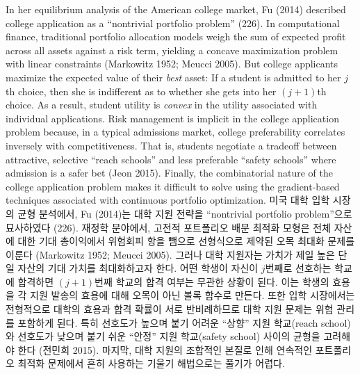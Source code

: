 \documentclass[11pt]{article} %
\theoremstyle{definition}
\theoremstyle{definition}
\begin{document}
\ifen
In her equilibrium analysis of the American college market, Fu (2014) described college application as a ``nontrivial portfolio problem'' (226). In computational finance, traditional portfolio allocation models weigh the sum of expected profit across all assets against a risk term, yielding a concave maximization problem with linear constraints (Markowitz 1952; Meucci 2005). But college applicants maximize the expected value of their \emph{best} asset: If a student is admitted to her $j$th choice, then she is indifferent as to whether she gets into her $(j+1)$th choice. As a result, student utility is \emph{convex} in the utility associated with individual applications. Risk management is implicit in the college application problem because, in a typical admissions market, college preferability correlates inversely with competitiveness. That is, students negotiate a tradeoff between attractive, selective “reach schools” and less preferable “safety schools” where admission is a safer bet (Jeon 2015). Finally, the combinatorial nature of the college application problem makes it difficult to solve using the gradient-based techniques associated with continuous portfolio optimization.
\else
미국 대학 입학 시장의 균형 분석에서, Fu (2014)는 대학 지원 전략을 ``nontrivial portfolio problem''으로 묘사하였다 (226). 재정학 분야에서, 고전적 포트폴리오 배분 최적화 모형은 전체 자산에 대한 기대 총이익에서 위험회피 항을 뺌으로 선형식으로 제약된 오목 최대화 문제를 이룬다 (Markowitz 1952; Meucci 2005). 그러나 대학 지원자는 가치가 제일 높은 단일 자산의 기대 가치를 최대화하고자 한다. 어떤 학생이 자신이 $j$번째로 선호하는 학교에 합격하면 $(j+1)$번째 학교의 합격 여부는 무관한 상황이 된다. 이는 학생의 효용을 각 지원 발송의 효용에 대해 오목이 아닌 볼록 함수로 만든다. 또한 입학 시장에서는 전형적으로 대학의 효용과 합격 확률이 서로 반비례하므로 대학 지원 문제는 위험 관리를 포함하게 된다. 특히 선호도가 높으며 붙기 어려운 “상향” 지원 학교(reach school)와 선호도가 낮으며 붙기 쉬운 “안정” 지원 학교(safety school) 사이의 균형을 고려해야 한다 (전민희 2015). 마지막, 대학 지원의 조합적인 본질로 인해 연속적인 포트폴리오 최적화 문제에서 흔히 사용하는 기울기 해법으로는 풀기가 어렵다.
\fi
\end{document}
